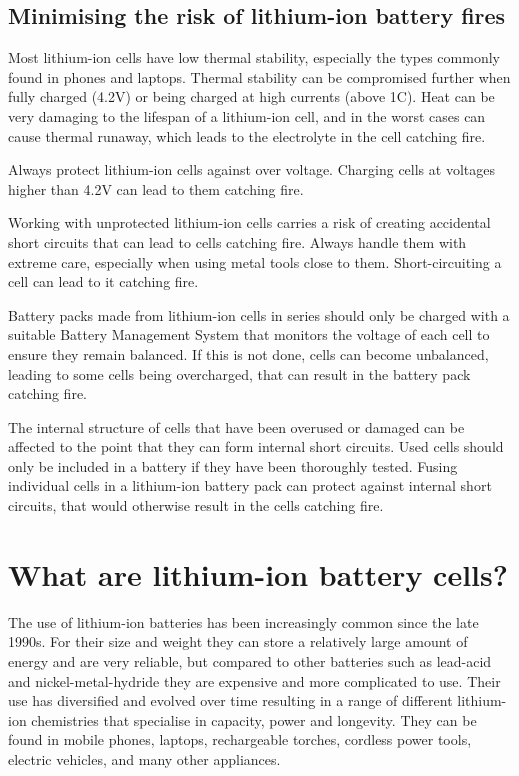 \documentclass{article}
\theoremstyle{definition}
\theoremstyle{definition}
\theoremstyle{remark}
\begin{document}
  \subsection{Minimising the risk of lithium-ion battery fires} %
  \label{sub:minimising_the_risk_of_lithium_ion_battery_fires}
  
    Most lithium-ion cells have low thermal stability, especially the types commonly found in phones and laptops. Thermal stability can be compromised further when fully charged (4.2V) or being charged at high currents (above 1C). Heat can be very damaging to the lifespan of a lithium-ion cell, and in the worst cases can cause thermal runaway, which leads to the electrolyte in the cell catching fire.

    Always protect lithium-ion cells against over voltage. Charging cells at voltages higher than 4.2V can lead to them catching fire.

    Working with unprotected lithium-ion cells carries a risk of creating accidental short circuits that can lead to cells catching fire. Always handle them with extreme care, especially when using metal tools close to them. Short-circuiting a cell can lead to it catching fire.

    Battery packs made from lithium-ion cells in series should only be charged with a suitable Battery Management System that monitors the voltage of each cell to ensure they remain balanced. If this is not done, cells can become unbalanced, leading to some cells being overcharged, that can result in the battery pack catching fire. 

    The internal structure of cells that have been overused or damaged can be affected to the point that they can form internal short circuits. Used cells should only be included in a battery if they have been thoroughly tested. Fusing individual cells in a lithium-ion battery pack can protect against internal short circuits, that would otherwise result in the cells catching fire.



\section{What are lithium-ion battery cells?} %
\label{sec:what_are_lithium_ion_battery_cells}

  The use of lithium-ion batteries has been increasingly common since the late 1990s. For their size and weight they can store a relatively large amount of energy and are very reliable, but compared to other batteries such as lead-acid and nickel-metal-hydride they are expensive and more complicated to use. Their use has diversified and evolved over time resulting in a range of different lithium-ion chemistries that specialise in capacity, power and longevity. They can be found in mobile phones, laptops, rechargeable torches, cordless power tools, electric vehicles, and many other appliances. 
\end{document}

